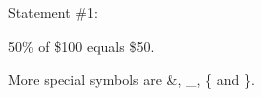 \documentclass{article}
\begin{document}
Statement \#1:

50\% of \$100 equals \$50.

More special symbols are \&, \_, \{ and \}.
\end{document}

